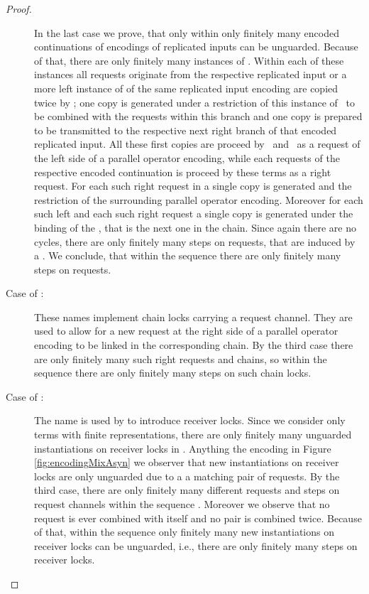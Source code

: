 \documentclass[]{llncs}
\begin{document}
\begin{proof}
\begin{description}
			In the last case we prove, that only within  only finitely many encoded continuations of encodings of replicated inputs can be unguarded. Because of that, there are only finitely many instances of \encodedContinuation. Within each of these instances all requests originate from the respective replicated input or a more left instance of \encodedContinuation of the same replicated input encoding are copied twice by \pushRequestsIn; one copy is generated under a restriction of this instance of \encodedContinuation \ to be combined with the requests within this branch and one copy is prepared to be transmitted to the respective next right branch of that encoded replicated input. All these first copies are proceed by \processRightOutputRequests \ and \processRightInputRequests \ as a request of the left side of a parallel operator encoding, while each requests of the respective encoded continuation is proceed by these terms as a right request. For each such right request in \pushRequestsOut a single copy is generated and the restriction of the surrounding parallel operator encoding. Moreover for each such left and each such right request a single copy is generated under the binding of the \encodedContinuation, that is the next one in the chain. Since again there are no cycles, there are only finitely many steps on requests, that are induced by a \encodedContinuation. We conclude, that within the sequence  there are only finitely many steps on requests.
		\item[Case of :] These names implement chain locks carrying a request channel. They are used to allow for a new request at the right side of a parallel operator encoding to be linked in the corresponding chain. By the third case there are only finitely many such right requests and chains, so within the sequence  there are only finitely many steps on such chain locks.
		\item[Case of :] The name  is used by  to introduce receiver locks. Since we consider only terms with finite representations, there are only finitely many unguarded instantiations on receiver locks in . Anything the encoding in Figure \ref{fig:encodingMixAsyn} we observer that new instantiations on receiver locks are only unguarded due to a a matching pair of requests. By the third case, there are only finitely many different requests and steps on request channels within the sequence . Moreover we observe that no request is ever combined with itself and no pair is combined twice. Because of that, within the sequence  only finitely many new instantiations on receiver locks can be unguarded, i.e., there are only finitely many steps on receiver locks.
			

\end{description}
\end{proof}
\end{document}
